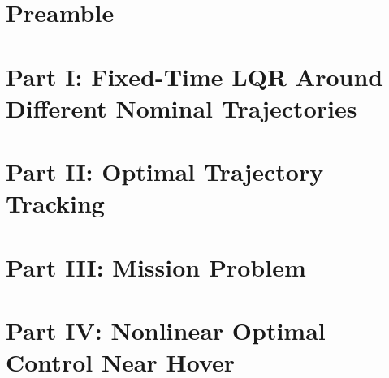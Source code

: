 \documentclass[9pt,a4paper,twocolumn,twoside]{article}
\theoremstyle{mynote}
\begin{document}
\twocolumn[
\begin{center}
{\small\color{softgray}\textsc{\mydoctype}\par}
\vspace{0.4em}
{\LARGE\bfseries\color{titleblue}\mytitle\par}
\vspace{0.8em}
{\normalsize\myauthors\par}
\vspace{0.5em}
{\small\color{softgray}\mydates\par}
\end{center}

\vspace{0.8em}
\hrule
\vspace{0.8em}

\vspace{0.4em}
]

\section*{Preamble}


\section{Part I: Fixed-Time LQR Around Different Nominal Trajectories}





\section{Part II: Optimal Trajectory Tracking}


\section{Part III: Mission Problem}


\section{Part IV: Nonlinear Optimal Control Near Hover}


% 

% 
\end{document}
